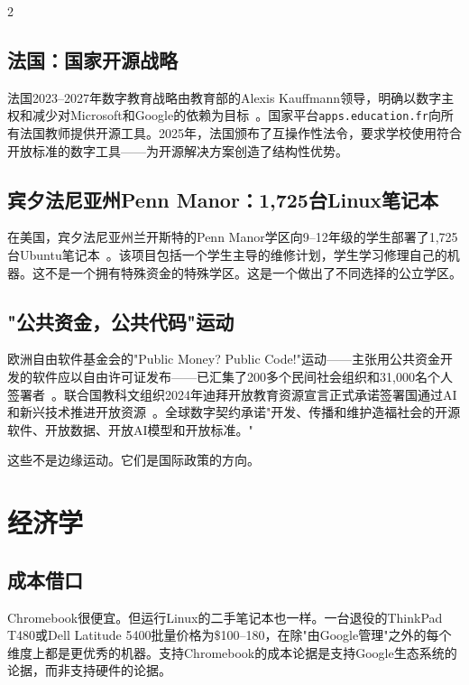 \documentclass[11pt, a4paper]{article}
\begin{document}
\begin{multicols}{2}
\subsection{法国：国家开源战略}

法国2023--2027年数字教育战略由教育部的Alexis Kauffmann领导，明确以数字主权和减少对Microsoft和Google的依赖为目标~\citep{france2023digital}。国家平台\texttt{apps.education.fr}向所有法国教师提供开源工具。2025年，法国颁布了互操作性法令，要求学校使用符合开放标准的数字工具——为开源解决方案创造了结构性优势。

\subsection{宾夕法尼亚州Penn Manor：1,725台Linux笔记本}

在美国，宾夕法尼亚州兰开斯特的Penn Manor学区向9--12年级的学生部署了1,725台Ubuntu笔记本~\citep{pennmanor2024linux}。该项目包括一个学生主导的维修计划，学生学习修理自己的机器。这不是一个拥有特殊资金的特殊学区。这是一个做出了不同选择的公立学区。

\subsection{"公共资金，公共代码"运动}

欧洲自由软件基金会的"Public Money? Public Code!"运动——主张用公共资金开发的软件应以自由许可证发布——已汇集了200多个民间社会组织和31,000名个人签署者~\citep{fsfe2024publiccode}。联合国教科文组织2024年迪拜开放教育资源宣言正式承诺签署国通过AI和新兴技术推进开放资源~\citep{unesco2024oer}。全球数字契约承诺"开发、传播和维护造福社会的开源软件、开放数据、开放AI模型和开放标准。"

这些不是边缘运动。它们是国际政策的方向。


\section{经济学}

\subsection{成本借口}

Chromebook很便宜。但运行Linux的二手笔记本也一样。一台退役的ThinkPad T480或Dell Latitude 5400批量价格为\$100--180，在除"由Google管理"之外的每个维度上都是更优秀的机器。支持Chromebook的成本论据是支持Google生态系统的论据，而非支持硬件的论据。


\end{multicols}
\end{document}
